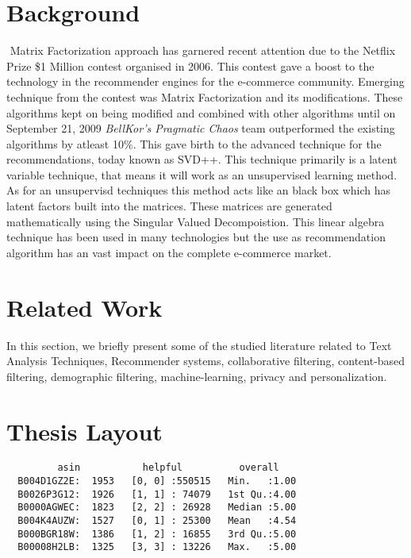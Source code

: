 \section{Background}‌​‌​‌​‌​‌​‌​‌​‌​‌​‌​‌​‌​‌​‌​‌​‌​
Matrix Factorization approach has garnered recent attention due to the Netflix Prize \cite{Bennett2007} \$1 Million contest organised in 2006. This contest gave a boost to the technology in the recommender engines for the e-commerce community. Emerging technique from the contest was Matrix Factorization and its modifications. These algorithms kept on being modified and combined with other algorithms until on September 21, 2009 \textit{BellKor's Pragmatic Chaos} team outperformed the existing algorithms by atleast 10\%. This gave birth to the advanced technique for the recommendations, today known as SVD++. This technique primarily is a latent variable technique, that means it will work as an unsupervised learning method. As for an unsupervisd techniques this method acts like an black box which has latent factors built into the matrices. These matrices are generated mathematically using the Singular Valued Decompoistion. This linear algebra technique has been used in many technologies but the use as recommendation algorithm has an vast impact on the complete e-commerce market.


\section{Related Work}
In this section, we briefly present some of the studied literature related to Text Analysis Techniques, Recommender systems, collaborative filtering, content-based filtering, demographic filtering, machine-learning, privacy and personalization.

\section{Thesis Layout}

\begin{verbatim}
         asin           helpful          overall    
  B004D1GZ2E:  1953   [0, 0] :550515   Min.   :1.00  
  B0026P3G12:  1926   [1, 1] : 74079   1st Qu.:4.00  
  B0000AGWEC:  1823   [2, 2] : 26928   Median :5.00  
  B004K4AUZW:  1527   [0, 1] : 25300   Mean   :4.54  
  B000BGR18W:  1386   [1, 2] : 16855   3rd Qu.:5.00  
  B00008H2LB:  1325   [3, 3] : 13226   Max.   :5.00  
\end{verbatim}


